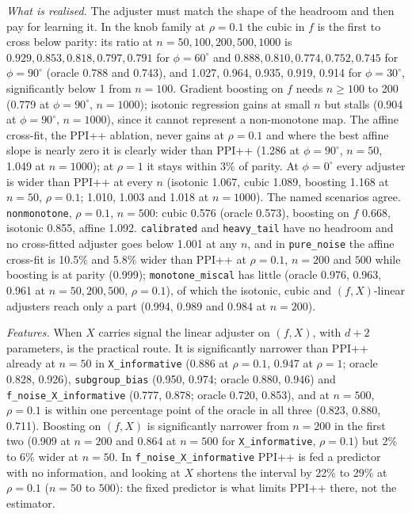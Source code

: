 \emph{What is realised.} The adjuster must match the shape of the headroom and then pay for learning it. In the knob family at $\rho=0.1$ the cubic in $f$ is the first to cross below parity: its ratio at $n=50,100,200,500,1000$ is
$0.929,0.853,0.818,0.797,0.791$ for $\phi=60^\circ$ and $0.888,0.810,0.774,0.752,0.745$ for $\phi=90^\circ$ (oracle 0.788 and 0.743), and 1.027, 0.964, 0.935, 0.919, 0.914 for $\phi=30^\circ$, significantly below 1 from $n=100$.
Gradient boosting on $f$ needs $n\ge100$ to 200 (0.779 at $\phi=90^\circ$, $n=1000$); isotonic regression gains at small $n$ but stalls (0.904 at $\phi=90^\circ$, $n=1000$), since it cannot represent a non-monotone map.
The affine cross-fit, the PPI++ ablation, never gains at $\rho=0.1$ and where the best affine slope is nearly zero it is clearly wider than PPI++ (1.286 at $\phi=90^\circ$, $n=50$, 1.049 at $n=1000$); at $\rho=1$ it stays within 3\% of parity.
At $\phi=0^\circ$ every adjuster is wider than PPI++ at every $n$ (isotonic 1.067, cubic 1.089, boosting 1.168 at $n=50$, $\rho=0.1$; 1.010, 1.003 and 1.018 at $n=1000$).
The named scenarios agree. \texttt{nonmonotone}, $\rho=0.1$, $n=500$: cubic 0.576 (oracle 0.573), boosting on $f$ 0.668, isotonic 0.855, affine 1.092.
\texttt{calibrated} and \texttt{heavy\_tail} have no headroom and no cross-fitted adjuster goes below 1.001 at any $n$, and in \texttt{pure\_noise} the affine cross-fit is 10.5\% and 5.8\% wider than PPI++ at $\rho=0.1$, $n=200$ and $500$ while boosting is at parity (0.999); \texttt{monotone\_miscal} has little (oracle 0.976, 0.963, 0.961 at $n=50,200,500$, $\rho=0.1$), of which the isotonic, cubic and $(f,X)$-linear adjusters reach only a part (0.994, 0.989 and 0.984 at $n=200$).

\emph{Features.} When $X$ carries signal the linear adjuster on $(f,X)$, with $d+2$ parameters, is the practical route. It is significantly narrower than PPI++ already at $n=50$ in \texttt{X\_informative} (0.886 at $\rho=0.1$, 0.947 at $\rho=1$; oracle 0.828, 0.926),
\texttt{subgroup\_bias} (0.950, 0.974; oracle 0.880, 0.946) and \texttt{f\_noise\_X\_informative} (0.777, 0.878; oracle 0.720, 0.853), and at $n=500$, $\rho=0.1$ is within one percentage point of the oracle in all three (0.823, 0.880, 0.711).
Boosting on $(f,X)$ is significantly narrower from $n=200$ in the first two (0.909 at $n=200$ and 0.864 at $n=500$ for \texttt{X\_informative}, $\rho=0.1$) but 2\% to 6\% wider at $n=50$.
In \texttt{f\_noise\_X\_informative} PPI++ is fed a predictor with no information, and looking at $X$ shortens the interval by 22\% to 29\% at $\rho=0.1$ ($n=50$ to $500$): the fixed predictor is what limits PPI++ there, not the estimator.

